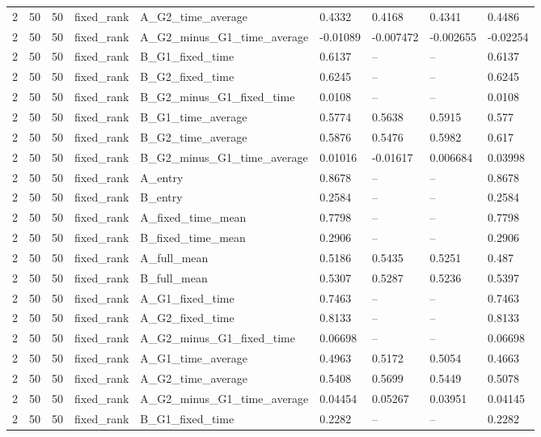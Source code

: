 \begin{longtable}{lllllllll}
2 & 50 & 50 & fixed\_rank & A\_G2\_time\_average & 0.4332 & 0.4168 & 0.4341 & 0.4486 \\
2 & 50 & 50 & fixed\_rank & A\_G2\_minus\_G1\_time\_average & -0.01089 & -0.007472 & -0.002655 & -0.02254 \\
2 & 50 & 50 & fixed\_rank & B\_G1\_fixed\_time & 0.6137 & -- & -- & 0.6137 \\
2 & 50 & 50 & fixed\_rank & B\_G2\_fixed\_time & 0.6245 & -- & -- & 0.6245 \\
2 & 50 & 50 & fixed\_rank & B\_G2\_minus\_G1\_fixed\_time & 0.0108 & -- & -- & 0.0108 \\
2 & 50 & 50 & fixed\_rank & B\_G1\_time\_average & 0.5774 & 0.5638 & 0.5915 & 0.577 \\
2 & 50 & 50 & fixed\_rank & B\_G2\_time\_average & 0.5876 & 0.5476 & 0.5982 & 0.617 \\
2 & 50 & 50 & fixed\_rank & B\_G2\_minus\_G1\_time\_average & 0.01016 & -0.01617 & 0.006684 & 0.03998 \\
2 & 50 & 50 & fixed\_rank & A\_entry & 0.8678 & -- & -- & 0.8678 \\
2 & 50 & 50 & fixed\_rank & B\_entry & 0.2584 & -- & -- & 0.2584 \\
2 & 50 & 50 & fixed\_rank & A\_fixed\_time\_mean & 0.7798 & -- & -- & 0.7798 \\
2 & 50 & 50 & fixed\_rank & B\_fixed\_time\_mean & 0.2906 & -- & -- & 0.2906 \\
2 & 50 & 50 & fixed\_rank & A\_full\_mean & 0.5186 & 0.5435 & 0.5251 & 0.487 \\
2 & 50 & 50 & fixed\_rank & B\_full\_mean & 0.5307 & 0.5287 & 0.5236 & 0.5397 \\
2 & 50 & 50 & fixed\_rank & A\_G1\_fixed\_time & 0.7463 & -- & -- & 0.7463 \\
2 & 50 & 50 & fixed\_rank & A\_G2\_fixed\_time & 0.8133 & -- & -- & 0.8133 \\
2 & 50 & 50 & fixed\_rank & A\_G2\_minus\_G1\_fixed\_time & 0.06698 & -- & -- & 0.06698 \\
2 & 50 & 50 & fixed\_rank & A\_G1\_time\_average & 0.4963 & 0.5172 & 0.5054 & 0.4663 \\
2 & 50 & 50 & fixed\_rank & A\_G2\_time\_average & 0.5408 & 0.5699 & 0.5449 & 0.5078 \\
2 & 50 & 50 & fixed\_rank & A\_G2\_minus\_G1\_time\_average & 0.04454 & 0.05267 & 0.03951 & 0.04145 \\
2 & 50 & 50 & fixed\_rank & B\_G1\_fixed\_time & 0.2282 & -- & -- & 0.2282 \\

\end{longtable}
